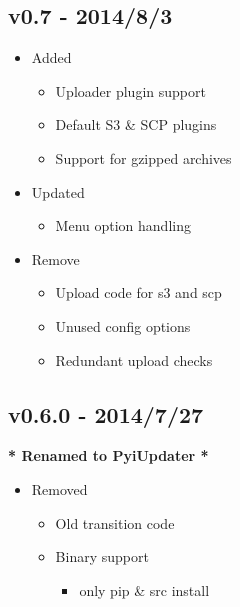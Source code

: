 \documentclass[letterpaper,10pt,english]{sphinxmanual}
\begin{document}
\subsection{v0.7 - 2014/8/3}
\label{release_history:v0-7-2014-8-3}\begin{itemize}
\item {} 
Added
\begin{itemize}
\item {} 
Uploader plugin support

\item {} 
Default S3 \& SCP plugins

\item {} 
Support for gzipped archives

\end{itemize}

\item {} 
Updated
\begin{itemize}
\item {} 
Menu option handling

\end{itemize}

\item {} 
Remove
\begin{itemize}
\item {} 
Upload code for s3 and scp

\item {} 
Unused config options

\item {} 
Redundant upload checks

\end{itemize}

\end{itemize}


\subsection{v0.6.0 - 2014/7/27}
\label{release_history:v0-6-0-2014-7-27}
\textbf{* Renamed to PyiUpdater *}
\begin{itemize}
\item {} 
Removed
\begin{itemize}
\item {} 
Old transition code

\item {} 
Binary support
\begin{itemize}
\item {} 
only pip \& src install

\end{itemize}

\end{itemize}

\end{itemize}
\end{document}
